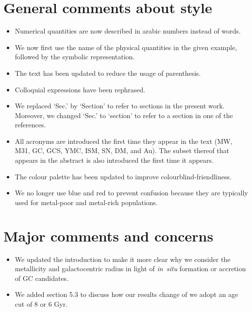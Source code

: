 \documentclass{article}
\begin{document}
\section*{General comments about style}
\begin{itemize}
\item Numerical quantities are now described in arabic numbers instead of words.
\item We now first use the name of the physical quantities in the given example,
    followed by the symbolic representation.
\item The text has been updated to reduce the usage of parenthesis.
\item Colloquial expressions have been rephrased.
\item We replaced `Sec.' by `Section' to refer to sections in the present work.
Moreover, we changed `Sec.' to `section' to refer to a section in one of the references.
\item All acronyms are introduced the first time they appear in the text
(MW, M31, GC, GCS, YMC, ISM, SN, DM, and Au). The subset thereof that appears 
in the abstract is also introduced the first time it appears.
\item The colour palette has been updated to improve colourblind-friendliness.
\item We no longer use blue and red to prevent confusion because they are 
typically used for metal-poor and metal-rich populations.
\end{itemize}


\section*{Major comments and concerns}
\begin{itemize}
\item We updated the introduction to make it more clear why we consider the metallicity
and galactocentric radius in light of {\it in~situ} formation or accretion of GC
candidates.
\item We added section 5.3 to discuss how our results change of we adopt an age cut
of 8 or 6 Gyr.
\end{itemize}
\end{document}
